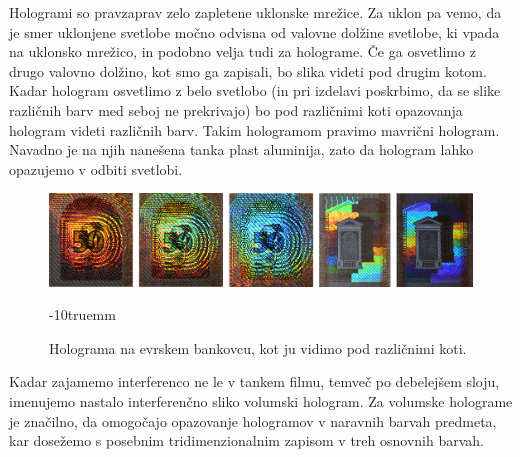 Hologrami so pravzaprav zelo zapletene uklonske mrežice. Za uklon pa vemo, da je 
smer uklonjene svetlobe močno odvisna od valovne dolžine svetlobe, ki vpada na uklonsko mrežico,
in podobno velja tudi za holograme. Če ga osvetlimo z drugo valovno dolžino, kot smo 
ga zapisali, bo slika videti pod drugim kotom. Kadar hologram osvetlimo z belo svetlobo
(in pri izdelavi poskrbimo, da se slike različnih barv med seboj ne prekrivajo)
bo pod različnimi koti opazovanja hologram videti različnih barv. Takim hologramom pravimo mavrični
hologram. Navadno je na njih nanešena tanka plast aluminija, zato da hologram lahko 
opazujemo v odbiti svetlobi.
\begin{figure}[!h]
\centering
\includegraphics[width=13truecm]{slike/08_photo_hologram.jpg}
\caption{Holograma na evrskem bankovcu, kot ju vidimo pod različnimi koti. }
\label{fig:08_photo_hologram}
\vglue-10truemm
\end{figure}

\begin{remark}
Kadar zajamemo interferenco ne le v tankem filmu, temveč po debelejšem sloju, imenujemo
nastalo interferenčno sliko volumski hologram. Za volumske holograme je značilno, da omogočajo 
opazovanje hologramov v naravnih barvah predmeta, kar dosežemo s posebnim tridimenzionalnim zapisom 
v treh osnovnih barvah.
\end{remark}
